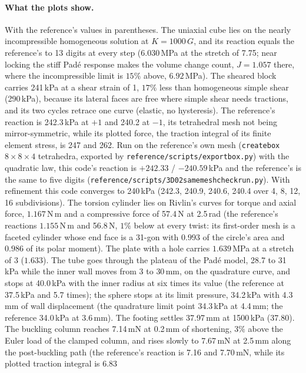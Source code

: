 \documentclass[11pt]{article}
\DeclareRobustCommand{\code}[1]{{\def\_{\textunderscore\allowbreak}\texttt{#1}}}
\DeclareRobustCommand{\file}[1]{{\def\_{\textunderscore\allowbreak}\texttt{#1}}}
\begin{document}
\paragraph{What the plots show.}
With the reference's values in parentheses.  The uniaxial cube lies on the
nearly incompressible homogeneous solution at $K = 1000\,G$, and its
reaction equals the reference's to 13 digits at every step ($6.030$\,MPa at
the stretch of 7.75; near locking the stiff Pad\'e response makes the volume
change count, $J = 1.057$ there, where the incompressible limit is $15\%$
above, $6.92$\,MPa).  The sheared block carries 241\,kPa at a shear strain
of 1, $17\%$ less than homogeneous simple shear (290\,kPa), because its
lateral faces are free where simple shear needs tractions, and its two
cycles retrace one curve (elastic, no hysteresis).  The reference's
reaction is 242.3\,kPa at $+1$ and 240.2 at $-1$, its tetrahedral mesh not
being mirror-symmetric, while its plotted force, the traction integral of
its finite element stress, is 247 and 262.  Run on the reference's own mesh
(\code{create\_box} $8\times8\times4$ tetrahedra, exported by
\file{reference/scripts/export\_box.py}) with the quadratic law, this code's
reaction is $+242.33$ / $-240.59$\,kPa and the reference's is the same to
five digits (\file{reference/scripts/3D02\_same\_mesh\_check\_run.py}).  With
refinement this code converges to 240\,kPa (242.3, 240.9, 240.6, 240.4
over 4, 8, 12, 16 subdivisions).  The torsion cylinder lies on Rivlin's curves for torque and
axial force, $1.167$\,N\,m and a compressive force of 57.4\,N at 2.5\,rad
(the reference's reactions $1.155$\,N\,m and 56.8\,N, $1\%$ below at
every twist: its first-order mesh is a faceted cylinder whose end face is a
31-gon with $0.993$ of the circle's area and $0.986$ of its polar moment).  The plate with a hole carries $1.639$\,MPa at a
stretch of 3 ($1.633$).  The tube goes through the plateau
of the Pad\'e model, 28.7 to 31\,kPa while the inner wall moves from 3 to
30\,mm, on the quadrature curve, and stops at 40.0\,kPa with the inner
radius at six times its value (the reference at 37.5\,kPa and 5.7 times);
the sphere stops at its limit pressure, 34.2\,kPa with 4.3\,mm of wall
displacement (the quadrature limit point 34.3\,kPa at 4.4\,mm; the
reference 34.0\,kPa at 3.6\,mm).  The footing settles 37.97\,mm at
1500\,kPa (37.80).  The buckling column reaches 7.14\,mN at 0.2\,mm of
shortening, $3\%$ above the Euler load of the clamped column, and rises
slowly to 7.67\,mN at 2.5\,mm along the post-buckling path (the reference's
reaction is 7.16 and 7.70\,mN, while its plotted traction integral is 6.83
\end{document}
